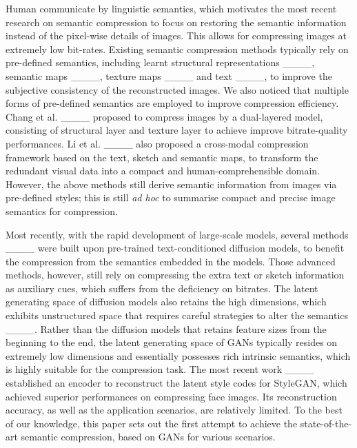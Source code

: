 {Human communicate by linguistic semantics, which motivates the most recent research on semantic compression to focus on restoring the semantic information instead of the pixel-wise details of images. This allows for compressing images at extremely low bit-rates. Existing semantic compression methods typically rely on pre-defined semantics, including learnt structural representations ____, semantic maps ____, texture maps ____ and text ____, to improve the subjective consistency of the reconstructed images. We also noticed that multiple forms of pre-defined semantics are employed to improve compression efficiency. Chang et al. ____ proposed to compress images by a dual-layered model, consisting of structural layer and texture layer to achieve improve bitrate-quality performances.  Li et al. ____ also proposed a  cross-modal compression framework based on the text, sketch and semantic maps, to transform the redundant visual data into a compact and human-comprehensible domain. However, the above methods still derive semantic information  from images via pre-defined styles; this is still \textit{ad hoc} to summarise compact and precise image semantics for compression. }

{Most recently, with the rapid development of large-scale models, several methods ____ were built upon pre-trained text-conditioned diffusion models, to benefit the compression from the semantics embedded in the models. Those advanced methods, however, still rely on compressing the extra text or sketch information as auxiliary cues, which suffers from the deficiency on bitrates. The latent generating space of diffusion models also retains the high dimensions, which exhibits unstructured space that requires careful strategies to alter the semantics ____. Rather than the diffusion models that retains feature sizes from the beginning to the end, the latent generating space of GANs typically resides on extremely low dimensions and essentially possesses rich intrinsic semantics, which is highly suitable for the compression task. The most recent work ____ established an encoder to reconstruct the latent style codes for StyleGAN, which achieved superior performances on compressing face images. Its reconstruction accuracy, as well as the application scenarios, are relatively limited. To the best of our knowledge, this paper sets out the first attempt to achieve the state-of-the-art semantic compression, based on GANs for various scenarios.} 

\vspace{-1em}